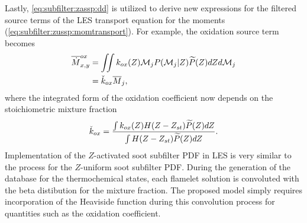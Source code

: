 Lastly, \cref{eq:subfilter:zassp:dd} is utilized to derive new expressions for the filtered source terms of the LES transport equation for the moments (\cref{eq:subfilter:zussp:momtransport}). For example, the oxidation source term becomes
\begin{equation}\label{eq:subfilter:zassp:ox}
  \begin{split}
    \fst[M]{x,y}^{ox} &= \iint k_{ox}(Z)\mc{M}_j P(\mc{M}_j|Z)\pz dZ d\mc{M}_j \\
    &= \check{k}_{ox}\mean{M}_j,
  \end{split}
\end{equation}
where the integrated form of the oxidation coefficient now depends on the stoichiometric mixture fraction
\begin{equation}\label{eq:subfilter:zassp:kox}
  \check{k}_{ox} = \frac{\int k_{ox}(Z)H(Z - Z_{st})\pz dZ}{\int H(Z - Z_{st})\pz dZ}.
\end{equation}
Implementation of the $Z$-activated soot subfilter PDF in LES is very similar to the process for the $Z$-uniform soot subfilter PDF. During the generation of the database for the thermochemical states, each flamelet solution is convoluted with the beta distibution for the mixture fraction. The proposed model simply requires incorporation of the Heaviside function during this convolution process for quantities such as the oxidation coefficient. 

